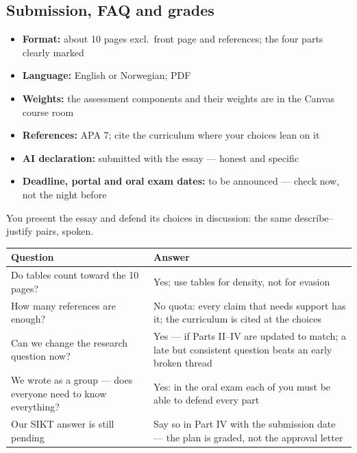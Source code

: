 \documentclass[11pt,a4paper,british,twoside=false,headings=small,chapterprefix=false,numbers=noenddot]{scrbook}
\newenvironment{block}[1]{\begin{tcolorbox}[scriptbox, title={#1}]}{\end{tcolorbox}}
\begin{document}
\subsection{Submission, FAQ and grades}
\begin{center}\small
\begin{itemize}\setlength{\itemsep}{0.45em}
    \item \textbf{Format:} about 10 pages excl.\ front page and references; the
          four parts clearly marked
    \item \textbf{Language:} English or Norwegian; PDF
    \item \textbf{Weights:} the assessment components and their weights are
          in the Canvas course room
    \item \textbf{References:} APA 7; cite the curriculum where your choices
          lean on it
    \item \textbf{AI declaration:} submitted with the essay --- honest and specific
    \item \textbf{Deadline, portal and oral exam dates:} to be announced ---
          check now, not the night before
  \end{itemize}
  
  \begin{block}{The oral exam in one line}
    You present the essay and defend its choices in discussion: the same
    describe--justify pairs, spoken.
  \end{block}
\end{center}

\begin{center}\small
\small
  \renewcommand{\arraystretch}{1.35}
  \begin{tabular}{@{}p{6.0cm}p{7.0cm}@{}}
    \toprule
    \textbf{Question} & \textbf{Answer}\\
    \midrule
    Do tables count toward the 10 pages? & Yes; use tables for density, not for evasion\\
    How many references are enough? & No quota: every claim that needs support has it; the curriculum is cited at the choices\\
    Can we change the research question now? & Yes --- if Parts II--IV are updated to match; a late but consistent question beats an early broken thread\\
    We wrote as a group --- does everyone need to know everything? & Yes: in the oral exam each of you must be able to defend every part\\
    Our SIKT answer is still pending & Say so in Part IV with the submission date --- the plan is graded, not the approval letter\\
    \bottomrule
  \end{tabular}
\end{center}
\end{document}
